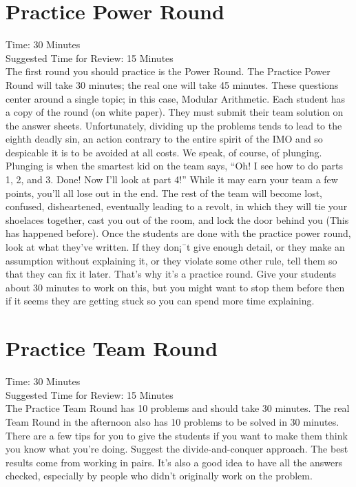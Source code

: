 \documentclass[11pt]{article}
\begin{document}
\begin{small}
\section{Practice Power Round}
\noindent Time: 30 Minutes \\
\noindent Suggested Time for Review: 15 Minutes\\
\noindent The first round you should practice is the Power Round. The Practice Power Round will take 30 minutes; the real one will take 45 minutes. These questions center around a single topic; in this case, Modular Arithmetic.  Each student has a copy of the round (on white paper).  They must submit their team solution on the answer sheets. Unfortunately, dividing up the problems tends to lead to the eighth deadly sin, an action contrary to the entire spirit of the IMO and so despicable it is to be avoided at all costs. We speak, of course, of plunging. Plunging is when the smartest kid on the team says, ``Oh! I see how to do parts 1, 2, and 3. Done! Now I'll look at part 4!'' While it may earn your team a few points, you'll all lose out in the end. The rest of the team will become lost, confused, disheartened, eventually leading to a revolt, in which they will tie your shoelaces together, cast you out of the room, and lock the door behind you (This has happened before). Once the students are done with the practice power round, look at what they've written. If they don¡¯t give enough detail, or they make an assumption without explaining it, or they violate some other rule, tell them so that they can fix it later. That's why it's a practice round. Give your students about 30 minutes to work on this, but you might want to stop them before then if it seems they are getting stuck so you can spend more time explaining.

\section{Practice Team Round}
\noindent Time: 30 Minutes \\
\noindent Suggested Time for Review: 15 Minutes\\
\noindent The Practice Team Round has 10 problems and should take 30 minutes. The real Team Round in the afternoon also has 10 problems to be solved in 30 minutes.  There are a few tips for you to give the students if you want to make them think you know what you're doing. Suggest the divide-and-conquer approach. The best results come from working in pairs. It's also a good idea to have all the answers checked, especially by people who didn't originally work on the problem.


\end{small}
\end{document}
